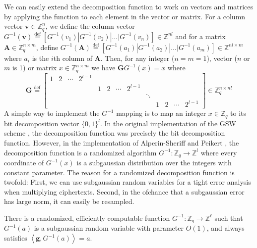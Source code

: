 We can easily extend the decomposition function to work on vectors and matrices by applying the function to each element in the vector or matrix. For a column vector $\mathbf{v} \in \mathbb{Z}_q^n$, we define the column vector $G^{-1}(\mathbf{v}) \stackrel{\mathrm{def}}{=} [G^{-1}(v_1)|G^{-1}(v_2)| \dots |G^{-1}(v_n)] \in \mathbb{Z}^{nl}$ and for a matrix $\mathbf{A} \in \mathbb{Z}_q^{n \times m}$, define $G^{-1}(\mathbf{A}) \stackrel{\mathrm{def}}{=} [G^{-1}(a_1)|G^{-1}(a_2)| \dots |G^{-1}(a_m)] \in \mathbb{Z}^{nl \times m}$ where $a_i$ is the $i$th column of $\mathbf{A}$. Then, for any integer ($n = m = 1$), vector ($n$ or $m$ is 1) or matrix $x \in \mathbb{Z}_q^{n \times m}$ we have $\mathbf{G}G^{-1}(x) = x$ where 
\begin{equation*}
    \mathbf{G} \stackrel{\mathrm{def}}{=}
    \left[
        \begin{array}{ccccccccccccc}
        1 & 2 & \cdots & 2^{l-1} \\
         & & & & 1 & 2 & \cdots  & 2^{l-1} \\
         & & & & & & & & \ddots \\
         & & & & & & & & & 1 & 2 & \cdots & 2^{l-1}
        \end{array}
    \right] \in \mathbb{Z}_q^{n \times nl}
\end{equation*}
A simple way to implement the $G^{-1}$ mapping is to map an integer $x \in \mathbb{Z}_q$ to its bit decomposition vector $\{0,1\}^{l}$. In the original implementation of the GSW scheme \cite{GSW13}, the decomposition function was precisely the bit decomposition function. However, in the implementation of Alperin-Sheriff and Peikert \cite{A-S-P-boot}, the decomposition function is a randomized algorithm $G^{-1} \colon \mathbb{Z}_q \to \mathbb{Z}^{l}$ where every coordinate of $G^{-1}(x)$ is a subgaussian distribution over the integers with constant parameter. The reason for a randomized decomposition function is twofold: First, we can use subgaussian random variables for a tight error analysis when multiplying ciphertexts. Second, in the ofchance that a subgaussian error has large norm, it can easily be resampled.

\begin{theorem}\label{thm:decomposition}
    There is a randomized, efficiently computable function $G^{-1}: \mathbb{Z}_q \rightarrow \mathbb{Z}^{\ell}$ such that $G^{-1}(a)$ is a subgaussian random variable with parameter $O(1)$, and always satisfies $\left \langle \mathbf{g}, G^{-1}(a) \right \rangle=a$. 
\end{theorem}

